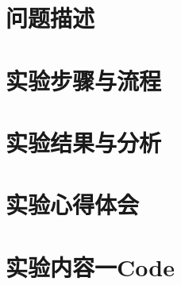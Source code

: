 \documentclass[12pt]{article}
\begin{document}
\section{问题描述}

\section{实验步骤与流程}

\section{实验结果与分析}

\section{实验心得体会}

\newpage
\appendix
\section*{实验内容一Code}

\begin{lstlisting}[language=Python]

\end{lstlisting}
\end{document}
